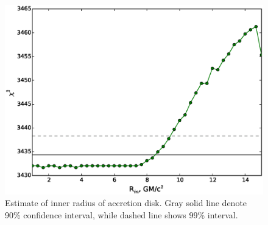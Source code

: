 \documentclass[a4paper,fleqn,usenatbib]{mnras}
\begin{document}
\begin{figure}
\centerline{\includegraphics[width=\linewidth]{rinfit_v03.eps}}
\caption{Estimate of inner radius of accretion disk. Gray solid line denote 90\% confidence interval, while dashed line shows 99\% interval.} 
\label{fig:rin}
\end{figure}  
\end{document}

